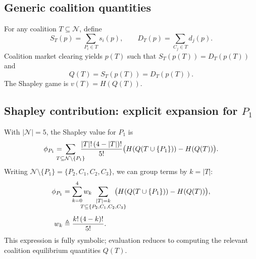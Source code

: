 \documentclass[journal, a4paper]{IEEEtran}
\begin{document}
\subsection{Generic coalition quantities}
For any coalition $T\subseteq \mathcal{N}$, define
\begin{equation}
S_T(p)=\sum_{P_i\in T} s_i(p),\qquad
D_T(p)=\sum_{C_j\in T} d_j(p).
\end{equation}
Coalition market clearing yields $p(T)$ such that $S_T(p(T))=D_T(p(T))$ and
\begin{equation}
Q(T)=S_T(p(T))=D_T(p(T)).
\end{equation}
The Shapley game is $v(T)=H(Q(T))$.

\subsection{Shapley contribution: explicit expansion for $P_1$}
With $|\mathcal{N}|=5$, the Shapley value for $P_1$ is
\begin{equation}
\phi_{P_1}
=\mspace{-20mu}
\sum_{T\subseteq \mathcal{N}\setminus\{P_1\}}\mspace{-15mu}
\frac{|T|!\,(4-|T|)!}{5!}\big(H(Q(T\cup\{P_1\}))-H(Q(T))\big).
\end{equation}
Writing $\mathcal{N}\setminus\{P_1\}=\{P_2,C_1,C_2,C_3\}$, we can group terms by $k=|T|$:
\begin{align}
\phi_{P_1}&=\sum_{k=0}^{4} w_k \mspace{-33mu} \sum_{\substack{|T|=k\\T\subseteq \{P_2,C_1,C_2,C_3\} }}\mspace{-33mu}
\big(H(Q(T\cup\{P_1\}))-H(Q(T))\big),\\[1ex]
w_k&\triangleq \frac{k!\,(4-k)!}{5!}.
\end{align}
This expression is fully symbolic; evaluation reduces to computing the relevant coalition equilibrium quantities $Q(T)$.
\end{document}
